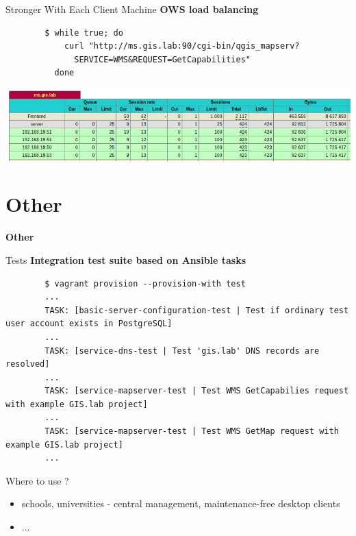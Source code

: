 \documentclass[12pt]{beamer}
\begin{document}
\begin{frame}[fragile]{Stronger With Each Client Machine}
	\textbf{OWS load balancing}

	\lstset{language=sh}
	\begin{lstlisting}
		$ while true; do
		    curl "http://ms.gis.lab:90/cgi-bin/qgis_mapserv?
		      SERVICE=WMS&REQUEST=GetCapabilities"
		  done
	\end{lstlisting}
	\begin{center}
		\includegraphics[keepaspectratio=true,width=\textwidth]{images/haproxy-stats.png}
	\end{center}
\end{frame}


\section{Other}
\begin{frame}
	\begin{center}
		\LARGE\textbf{Other}
	\end{center}
\end{frame}

\begin{frame}[fragile]{Tests}
	\textbf{Integration test suite based on Ansible tasks}
	
	\lstset{language=sh}
	\begin{lstlisting}
		$ vagrant provision --provision-with test
		...
		TASK: [basic-server-configuration-test | Test if ordinary test user account exists in PostgreSQL]
		...
		TASK: [service-dns-test | Test 'gis.lab' DNS records are resolved]
		...
		TASK: [service-mapserver-test | Test WMS GetCapabilies request with example GIS.lab project]
		...
		TASK: [service-mapserver-test | Test WMS GetMap request with example GIS.lab project]
		...
	\end{lstlisting}
\end{frame}

\begin{frame}{Where to use ?}
	\begin{itemize}
		\item schools, universities - central management, maintenance-free desktop clients
		\item ...
	\end{itemize}
\end{frame}
\end{document}
